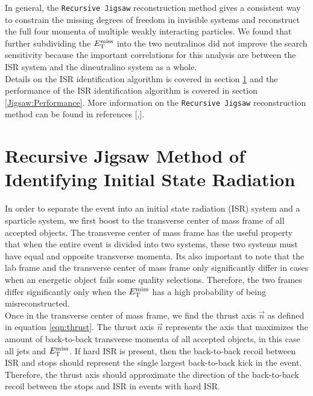 \indent In general, the {\tt Recursive Jigsaw} reconstruction method gives a consistent way to constrain the missing degrees of freedom in invisible systems and reconstruct the full four momenta of multiple weakly interacting particles.  We found that further subdividing the $E_{\mathrm{T}}^{\mathrm{miss}}$ into the two neutralinos did not improve the search sensitivity because the important correlations for this analysis are between the ISR system and the dineutralino system as a whole.  \\

\indent Details on the ISR identification algorithm is covered in section \ref{Jigsaw:ISR} and the performance of the ISR identification algorithm is covered in section \ref{Jigsaw:Performance}. More information on the {\tt Recursive Jigsaw} reconstruction method can be found in references [\cite{JigsawCompressed},\cite{JigsawContraBoost}]. \\

\section{Recursive Jigsaw Method of Identifying Initial State Radiation}
\label{Jigsaw:ISR}

\indent In order to separate the event into an initial state radiation (ISR) system and a sparticle system, we first boost to the transverse center of mass frame of all accepted objects.  The transverse center of mass frame has the useful property that when the entire event is divided into two systems, these two systems must have equal and opposite transverse momenta.  Its also important to note that the lab frame and the transverse center of mass frame only significantly differ in cases when an energetic object fails some quality selections.  Therefore, the two frames differ significantly only when the $E_{\mathrm{T}}^{\mathrm{miss}}$ has a high probability of being misreconstructed. \\

\indent Once in the transverse center of mass frame, we find the thrust axis $\vec{n}$ as defined in equation \ref{eqn:thrust}.  The thrust axis $\vec{n}$ represents the axis that maximizes the amount of back-to-back transverse momenta of all accepted objects, in this case all jets and $E_{\mathrm{T}}^{\mathrm{miss}}$.  If hard ISR is present, then the back-to-back recoil between ISR and stops should represent the single largest back-to-back kick in the event.  Therefore, the thrust axis should approximate the direction of the back-to-back recoil between the stops and ISR in events with hard ISR. \\

